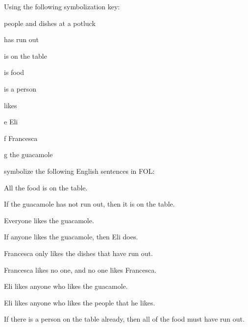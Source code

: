 \problempart
Using the following symbolization key:
\begin{ekey}
\item[\text{论域}] people and dishes at a potluck
\item[\atom{R}{x}]  has run out
\item[\atom{T}{x}]  is on the table
\item[\atom{F}{x}]  is food
\item[\atom{P}{x}]  is a person
\item[\atom{L}{x,y}]  likes 
\item[e] Eli
\item[f] Francesca
\item[g] the guacamole
\end{ekey}
symbolize the following English sentences in FOL:
\begin{compactlist}
\item All the food is on the table.
\item[] 
\item If the guacamole has not run out, then it is on the table.
\item[] 
\item Everyone likes the guacamole.
\item[] 
\item If anyone likes the guacamole, then Eli does.
\item[] \item Francesca only likes the dishes that have run out.
\item[] 
\item Francesca likes no one, and no one likes Francesca.
\item[] 
\item Eli likes anyone who likes the guacamole.
\item[] 
\item Eli likes anyone who likes the people that he likes.
\item[] 
\item If there is a person on the table already, then all of the food must have run out.
\item[] 
\end{compactlist}

